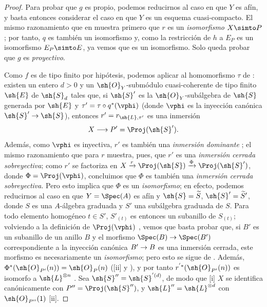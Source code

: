 \documentclass[oneside,10pt]{amsart}
\makeatletter
\newcommand{\ega@arrow}[2]{\mathchoice{#1}{#2}{#2}{#2}}
\renewcommand{\to}{\ega@arrow{\longrightarrow}{\rightarrow}}
\newcommand{\oldpage}[2][]{\marginnote{\normalfont\footnotesize\textbf{#1}~|~#2}\ignorespaces}
\makeatother
\begin{document}
\begin{proof}
Para probar que $g$ es propio, podemos reducirnos al caso en que $Y$ es afín, y basta entonces considerar el caso en que $Y$ es un esquema cuasi-compacto.
El mismo razonamiento que en  muestra primero que $r$ es un \emph{isomorfismo} $X\simto P$;
por tanto, $q$ es también un isomorfismo y, como la restricción de $h$ a $E_P$ es un isomorfismo $E_P\simto E$, ya vemos que  es un isomorfismo.
Solo queda probar que $g$ es \emph{proyectivo}.

Como $f$ es de tipo finito por hipótesis, podemos aplicar  al homomorfismo
\oldpage[II]{180}
$\tau$ de :
existen un entero $d>0$ y un $\sh{O}_Y$-submódulo cuasi-coherente de tipo finito $\sh{E}$ de $\sh{S}_d$ tales que, si $\sh{S}'$ es la $\sh{O}_Y$-subálgebra de $\sh{S}$ generada por $\sh{E}$ y $\tau'=\tau\circ q^*(\vphi)$ (donde $\vphi$ es la inyección canónica $\sh{S}'\to\sh{S}$), entonces $r'=r_{\sh{L},\tau'}$ es una inmersión
\[
  X\to P'=\Proj(\sh{S}').
\]
Además, como $\vphi$ es inyectiva, $r'$ es también una \emph{inmersión dominante} ;
el mismo razonamiento que para $r$ muestra, pues, que $r'$ es una \emph{inmersión cerrada sobreyectiva};
como $r'$ se factoriza en $X\xrightarrow{r}\Proj(\sh{S})\xrightarrow{\Phi}\Proj(\sh{S}')$, donde $\Phi=\Proj(\vphi)$, concluimos que $\Phi$ es también una \emph{inmersión cerrada sobreyectiva}.
Pero esto implica que $\Phi$ es un \emph{isomorfismo};
en efecto, podemos reducirnos al caso en que $Y=\Spec(A)$ es afín y $\sh{S}=\widetilde{S}$, $\sh{S}'=\widetilde S'$, donde $S$ es una $A$-álgebra graduada y $S'$ una subálgebra graduada de $S$.
Para todo elemento homogéneo $t\in S'$, $S'_{(t)}$ es entonces un subanillo de $S_{(t)}$;
volviendo a la definición de $\Proj(\vphi)$ , vemos que basta probar que, si $B'$ es un subanillo de un anillo $B$ y el morfismo $\Spec(B)\to\Spec(B')$ correspondiente a la inyección canónica $B'\to B$ es una inmersión cerrada, este morfismo es necesariamente un \emph{isomorfismo};
pero esto se sigue de .
Además, $\Phi^*(\sh{O}_{P'}(n))=\sh{O}_P(n)$ ([ii] y ), y por tanto $r^{'*}(\sh{O}_{P'}(n))$ es isomorfo a $\sh{L}^{\otimes n}$ .
Sea $\sh{S}''=\sh{S}^{'(d)}$, de modo que [i] $X$ se identifica canónicamente con $P''=\Proj(\sh{S}'')$, y $\sh{L}''=\sh{L}^{\otimes d}$ con $\sh{O}_{P''}(1)$ [ii].


\end{proof}
\end{document}
